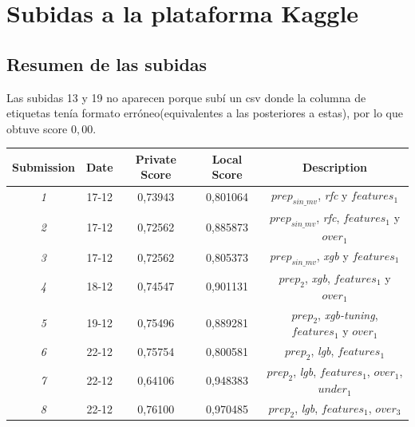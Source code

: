 \section{Subidas a la plataforma Kaggle}

\subsection{Resumen de las subidas}

Las subidas 13 y 19 no aparecen porque subí un csv donde la columna de etiquetas tenía formato erróneo(equivalentes a las posteriores a estas), por lo que obtuve score $0,00$.

\begin{table}[H]
\centering
\begin{tabular}{|c|c|c|c|c|}
\hline
\textbf{Submission} & \textbf{Date} & \textbf{Private Score}         & \textbf{Local Score} & \textbf{Description} \\ \hline
\textit{1}          & 17-12         & {\color[HTML]{134F5C} 0,73943} & 0,801064             &      $prep_{sin\_mv}$, \textit{rfc} y $features_{1}$             \\ \hline
\textit{2}          & 17-12         & {\color[HTML]{134F5C} 0,72562} & 0,885873             &         $prep_{sin\_mv}$, \textit{rfc}, $features_{1}$                        y $over_{1}$ \\ \hline
\textit{3}          & 17-12         & {\color[HTML]{134F5C} 0,72562} & 0,805373             &       $prep_{sin\_mv}$, \textit{xgb} y $features_{1}$                           \\ \hline
\textit{4}          & 18-12         & {\color[HTML]{134F5C} 0,74547} & 0,901131             &        $prep_{2}$, \textit{xgb}, $features_{1}$ y $over_{1}$                                        \\ \hline
\textit{5}          & 19-12         & {\color[HTML]{134F5C} 0,75496} & 0,889281            &        $prep_{2}$, \textit{xgb-tuning}, $features_{1}$ y $over_{1}$               \\ \hline
\textit{6}          & 22-12         & {\color[HTML]{134F5C} 0,75754} & 0,800581             &        $prep_{2}$, \textit{lgb}, $features_{1}$              \\ \hline
\textit{7}          & 22-12         & {\color[HTML]{134F5C} 0,64106} & 0,948383             &            $prep_{2}$, \textit{lgb}, $features_{1}$,                       $over_{1}$, $under_{1}$ \\ \hline
\textit{8}          & 22-12         & {\color[HTML]{00F000} 0,76100}    & 0,970485             &        $prep_{2}$, \textit{lgb}, $features_{1}$, $over_{3}$                            \\ \hline

\end{tabular}
\end{table}
